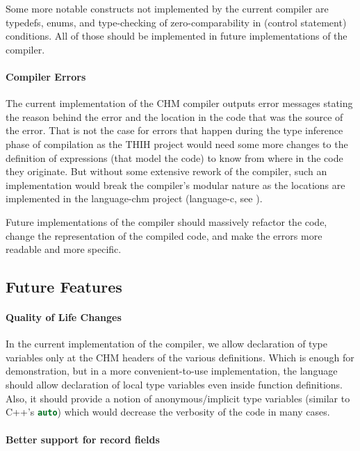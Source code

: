 Some more notable constructs not implemented by the current compiler are typedefs, enums, and type-checking of zero-comparability in (control statement) conditions. All of those should be implemented in future implementations of the compiler.

\paragraph{Compiler Errors}

The current implementation of the CHM compiler outputs error messages stating the reason behind the error and the location in the code that was the source of the error. That is not the case for errors that happen during the type inference phase of compilation as the THIH \cite{jones1999typing} project would need some more changes to the definition of expressions (that model the code) to know from where in the code they originate. But without some extensive rework of the compiler, such an implementation would break the compiler's modular nature as the locations are implemented in the language-chm project (language-c, see \cite{visq2018language-c}).

Future implementations of the compiler should massively refactor the code, change the representation of the compiled code, and make the errors more readable and more specific.

\subsection{Future Features}

\paragraph{Quality of Life Changes}

In the current implementation of the compiler, we allow declaration of type variables only at the CHM headers of the various definitions. Which is enough for demonstration, but in a more convenient-to-use implementation, the language should allow declaration of local type variables even inside function definitions. Also, it should provide a notion of anonymous/implicit type variables (similar to C++'s \lstinline[language=c++]{auto}) which would decrease the verbosity of the code in many cases.

\paragraph{Better support for record fields}

